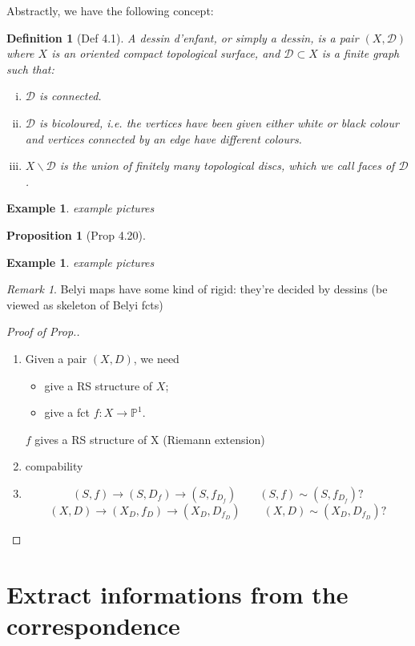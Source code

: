 \documentclass[reqno,11pt]{amsart}
\numberwithin{equation}{section}
\theoremstyle{plain}
\newtheorem{proposition}[theorem]{Proposition}
\newtheorem{defn}[theorem]{Definition}
\newtheorem{eg}[theorem]{Example}
\theoremstyle{plain}
\numberwithin{equation}{section}
\theoremstyle{remark}
\newtheorem{remark}[theorem]{Remark}
\begin{document}
Abstractly, we have the following concept:
\begin{defn}[Def 4.1]
	 A dessin d'enfant, or simply a dessin, is a pair
	 $(X, \mathcal{D})$ where $X$ is an oriented compact topological surface, and
	 $\mathcal{D} \subset X$ is a finite graph such that: 
	 	\begin{enumerate}[(i)]
	 		\item  $\mathcal{D}$ is connected.
	 		\item  $\mathcal{D}$ is bicoloured, i.e. the vertices have been given either white or black colour and vertices connected by an edge have different colours.
	 		\item  $X \smallsetminus \mathcal{D}$ is the union of finitely many topological discs, which we call faces of  $\mathcal{D}$.
	 	\end{enumerate}
\end{defn}
\begin{eg}
	example pictures
\end{eg}
\begin{proposition}[Prop 4.20]
\end{proposition}
\begin{eg}
	example pictures
\end{eg}
\begin{remark}
	Belyi maps have some kind of rigid: they're decided by dessins (be viewed as skeleton of Belyi fcts)
\end{remark}
\begin{proof}[Proof of Prop.]
	\begin{enumerate}[1.]
		\item Given a pair $(X,D)$, we need
		\begin{itemize}
			\item give a RS structure of $X$;
			\item give a fct $f:X\longrightarrow \mathbb{P}^1$.
		\end{itemize}
	$f$ gives a RS structure of X (Riemann extension)
	\item  compability
	\item $$(S,f) \rightarrow (S,D_f) \rightarrow (S,f_{D_f}) \qquad (S,f) \sim (S,f_{D_f})?$$
	$$(X,D) \rightarrow (X_D,f_D) \rightarrow (X_D,D_{f_D}) \qquad (X,D) \sim (X_D,D_{f_D})?$$
	\end{enumerate}
\end{proof}
\section{Extract informations from the correspondence}
\end{document}
